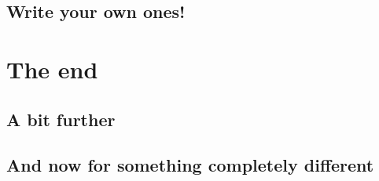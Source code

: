 \documentclass[ignorenonframetext,]{beamer}
\begin{document}
\subsection{Write your own ones!}

\section{The end}
\subsection{A bit further}
\subsection{And now for something completely different}
\end{document}
